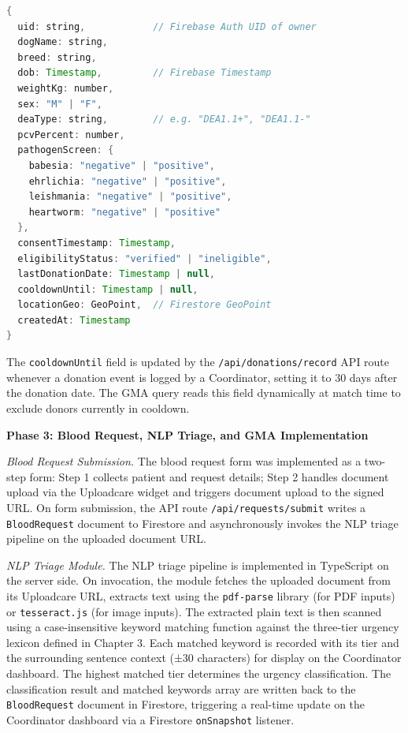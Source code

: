 \documentclass[12pt,a4paper]{article}
\begin{document}
\begin{lstlisting}[language=Java, caption={Firestore DonorProfile document structure}]
{
  uid: string,            // Firebase Auth UID of owner
  dogName: string,
  breed: string,
  dob: Timestamp,         // Firebase Timestamp
  weightKg: number,
  sex: "M" | "F",
  deaType: string,        // e.g. "DEA1.1+", "DEA1.1-"
  pcvPercent: number,
  pathogenScreen: {
    babesia: "negative" | "positive",
    ehrlichia: "negative" | "positive",
    leishmania: "negative" | "positive",
    heartworm: "negative" | "positive"
  },
  consentTimestamp: Timestamp,
  eligibilityStatus: "verified" | "ineligible",
  lastDonationDate: Timestamp | null,
  cooldownUntil: Timestamp | null,
  locationGeo: GeoPoint,  // Firestore GeoPoint
  createdAt: Timestamp
}
\end{lstlisting}

\noindent The \texttt{cooldownUntil} field is updated by the \texttt{/api/donations/record} API route whenever a donation event is logged by a Coordinator, setting it to 30 days after the donation date. The GMA query reads this field dynamically at match time to exclude donors currently in cooldown.

\vspace{1.2em}
\noindent\textbf{Phase 3: Blood Request, NLP Triage, and GMA Implementation}
\vspace{0.5em}

\noindent\textit{Blood Request Submission.} The blood request form was implemented as a two-step form: Step 1 collects patient and request details; Step 2 handles document upload via the Uploadcare widget and triggers document upload to the signed URL. On form submission, the API route \texttt{/api/requests/submit} writes a \texttt{BloodRequest} document to Firestore and asynchronously invokes the NLP triage pipeline on the uploaded document URL.

\noindent\textit{NLP Triage Module.} The NLP triage pipeline is implemented in TypeScript on the server side. On invocation, the module fetches the uploaded document from its Uploadcare URL, extracts text using the \texttt{pdf-parse} library (for PDF inputs) or \texttt{tesseract.js} (for image inputs). The extracted plain text is then scanned using a case-insensitive keyword matching function against the three-tier urgency lexicon defined in Chapter 3. Each matched keyword is recorded with its tier and the surrounding sentence context (±30 characters) for display on the Coordinator dashboard. The highest matched tier determines the urgency classification. The classification result and matched keywords array are written back to the \texttt{BloodRequest} document in Firestore, triggering a real-time update on the Coordinator dashboard via a Firestore \texttt{onSnapshot} listener.
\end{document}
